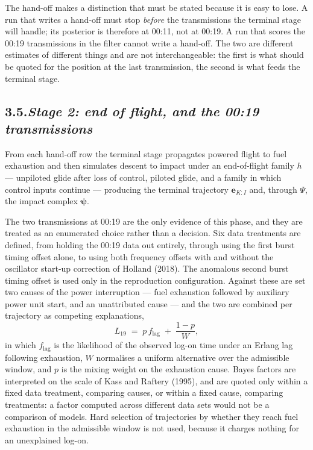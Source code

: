 \documentclass[12pt,a4paper]{article}
\newcommand{\impact}{\boldsymbol{\psi}}
\newcommand{\traj}{\mathbf{e}}
\begin{document}
The hand-off makes a distinction that must be stated because it is easy to lose. A run that
writes a hand-off must stop \emph{before} the transmissions the terminal stage will handle; its
posterior is therefore at 00:11, not at 00:19. A run that scores the 00:19 transmissions in the
filter cannot write a hand-off. The two are different estimates of different things and are not
interchangeable: the first is what should be quoted for the position at the last transmission,
the second is what feeds the terminal stage.

\subsection*{3.5.\quad \textit{Stage 2: end of flight, and the 00:19 transmissions}}

From each hand-off row the terminal stage propagates powered flight to fuel exhaustion and then
simulates descent to impact under an end-of-flight family $h$ --- unpiloted glide after loss of
control, piloted glide, and a family in which control inputs continue --- producing the terminal
trajectory $\traj_{K:I}$ and, through $\Psi$, the impact complex $\impact$.

The two transmissions at 00:19 are the only evidence of this phase, and they are treated as an
enumerated choice rather than a decision. Six data treatments are defined, from holding the
00:19 data out entirely, through using the first burst timing offset alone, to using both
frequency offsets with and without the oscillator start-up correction of Holland (2018). The
anomalous second burst timing offset is used only in the reproduction configuration. Against
these are set two causes of the power interruption --- fuel exhaustion followed by auxiliary
power unit start, and an unattributed cause --- and the two are combined per trajectory as
competing explanations,
%
\begin{equation}
L_{19} \;=\; p\,f_{\mathrm{lag}} \;+\; \frac{1-p}{W},
\end{equation}
%
in which $f_{\mathrm{lag}}$ is the likelihood of the observed log-on time under an Erlang lag
following exhaustion, $W$ normalises a uniform alternative over the admissible window, and $p$
is the mixing weight on the exhaustion cause. Bayes factors are interpreted on the scale of Kass and Raftery (1995), and are quoted only
within a fixed data treatment, comparing causes, or within a fixed cause, comparing treatments: a factor computed
across different data sets would not be a comparison of models. Hard selection of trajectories
by whether they reach fuel exhaustion in the admissible window is not used, because it charges
nothing for an unexplained log-on.
\end{document}
